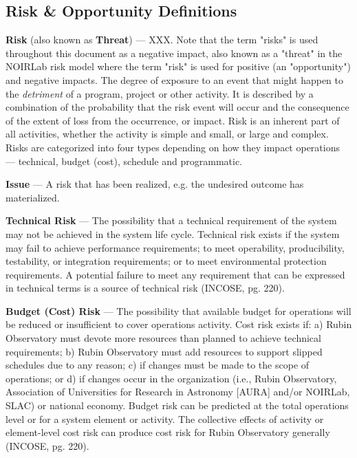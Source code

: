 \subsection{Risk \& Opportunity Definitions}
\label{sec:definitions}

\textbf{Risk} (also known as \textbf{Threat}) ---
XXX.
Note that the term "risks" is used throughout this document as a negative impact, also known as a "threat" in the NOIRLab risk model where the term "risk" is used for positive (an "opportunity") and negative impacts.
The degree of exposure to an event that might happen to the \emph{detriment} of a program, project or other activity.
It is described by a combination of the probability that the risk event will occur and the consequence of the extent of loss from the occurrence, or impact.
Risk is an inherent part of all activities, whether the activity is simple and small, or large and complex.
Risks are categorized into four types depending on how they impact operations --- technical, budget (cost), schedule and programmatic.

\textbf{Issue} ---
A risk that has been realized, e.g. the undesired outcome has materialized.

\textbf{Technical Risk} ---
The possibility that a technical requirement of the system may not be achieved in the system life cycle.
Technical risk exists if the system may fail to achieve performance requirements; to meet operability, producibility, testability, or integration requirements; or to meet environmental protection requirements.
A potential failure to meet any requirement that can be expressed in technical terms is a source of technical risk (INCOSE, pg. 220).

\textbf{Budget (Cost) Risk} ---
The possibility that available budget for operations will be reduced or insufficient to cover operations activity.
Cost risk exists if: a) Rubin Observatory must devote more resources than planned to achieve technical requirements; b) Rubin Observatory must add resources to support slipped schedules due to any reason; c) if changes must be made to the scope of operations; or d) if changes occur in the organization (i.e., Rubin Observatory, Association of Universities for Research in Astronomy [AURA] and/or NOIRLab, SLAC) or national economy.
Budget risk can be predicted at the total operations level or for a system element or activity.
The collective effects of activity or element-level cost risk can produce cost risk for Rubin Observatory generally (INCOSE, pg. 220).

